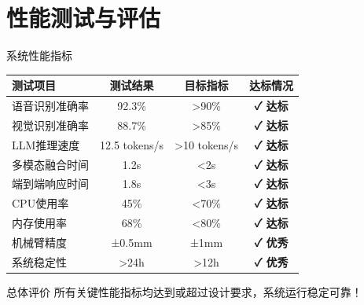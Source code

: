 \documentclass[aspectratio=169,12pt]{beamer}
\newcommand{\success}[1]{\textcolor{successgreen}{\textbf{#1}}}
\begin{document}
\section{性能测试与评估}

\begin{frame}{系统性能指标}
    \begin{table}[h]
        \centering
        \footnotesize
        \begin{tabular}{|l|c|c|c|}
        \hline
        \textbf{测试项目} & \textbf{测试结果} & \textbf{目标指标} & \textbf{达标情况} \\
        \hline
        语音识别准确率 & 92.3\% & >90\% & \success{✓ 达标} \\
        视觉识别准确率 & 88.7\% & >85\% & \success{✓ 达标} \\
        LLM推理速度 & 12.5 tokens/s & >10 tokens/s & \success{✓ 达标} \\
        多模态融合时间 & 1.2s & <2s & \success{✓ 达标} \\
        端到端响应时间 & 1.8s & <3s & \success{✓ 达标} \\
        CPU使用率 & 45\% & <70\% & \success{✓ 达标} \\
        内存使用率 & 68\% & <80\% & \success{✓ 达标} \\
        机械臂精度 & ±0.5mm & ±1mm & \success{✓ 优秀} \\
        系统稳定性 & >24h & >12h & \success{✓ 优秀} \\
        \hline
        \end{tabular}
    \end{table}
    
    \begin{alertblock}{总体评价}
        所有关键性能指标均达到或超过设计要求，系统运行稳定可靠！
    \end{alertblock}
\end{frame}
\end{document}
